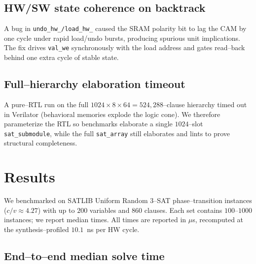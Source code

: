 \documentclass[11pt,letterpaper]{article}
\begin{document}
\subsection{HW/SW state coherence on backtrack}
A bug in \texttt{undo\_hw\_/load\_hw\_} caused the SRAM polarity bit
to lag the CAM by one cycle under rapid load/undo bursts, producing
spurious unit implications. The fix drives \texttt{val\_we}
synchronously with the load address and gates read--back behind one
extra cycle of stable state.

\subsection{Full--hierarchy elaboration timeout}
A pure--RTL run on the full $1024\!\times\!8\!\times\!64 = 524{,}288$--clause
hierarchy timed out in Verilator (behavioral memories explode the
logic cone). We therefore parameterize the RTL so benchmarks
elaborate a single $1024$--slot \texttt{sat\_submodule}, while the
full \texttt{sat\_array} still elaborates and lints to prove
structural completeness.

\section{Results}
We benchmarked on SATLIB Uniform Random 3--SAT phase--transition
instances ($c/v \approx 4.27$) with up to $200$ variables and $860$
clauses. Each set contains $100$--$1000$ instances; we report median
times. All times are reported in $\mu$s, recomputed at the
synthesis--profiled $10.1$~ns per HW cycle.

\subsection{End--to--end median solve time}
\end{document}
